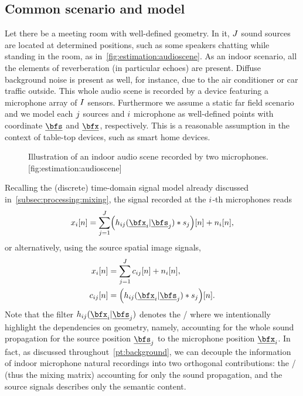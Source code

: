 \subsection{Common scenario and model}
Let there be a meeting room with well-defined geometry.
In it, $J$ sound sources are located at determined positions, such as some speakers chatting while standing in the room, as in~\cref{fig:estimation:audioscene}.
As an indoor scenario, all the elements of reverberation (in particular echoes) are present.
Diffuse background noise is present as well, for instance, due to the air conditioner or car traffic outside.
This whole audio scene is recorded by a device featuring a microphone array of $I$ sensors.
Furthermore we assume a static far field scenario and we model each $j$ sources and $i$ microphone as well-defined points with coordinate $\positionSource$ and $\positionMicrophone$, respectively.
This is a reasonable assumption in the context of table-top devices, such as smart home devices.
\begin{figure}[]
    \begin{sidecaption}{%
        Illustration of an indoor audio scene recorded by two microphones.
    }[fig:estimation:audioscene]
    \centering
    \resizebox{\linewidth}{!}{}
    \end{sidecaption}
\end{figure}
Recalling the (discrete) time-domain signal model already discussed in~\cref{subsec:processing:mixing}, the signal recorded at the $i$-th microphones reads
\begin{equation}
    \label{eq:application:mix}
    \mic_\idxMic[n] = \sum_{\idxSrc = 1}^{\numSrcs}
        \kparen{\flt_{\idxMicSrc}( \positionMicrophone_{\idxMic}  | \positionSource_{\idxSrc}) \convDis \src_{\idxSrc}} [n] + \nse_\idxMic[n]
    ,
\end{equation}
or alternatively, using the source spatial image signals,
\begin{equation}
    \label{eq:application:mix_img}
    \begin{aligned}
        \mic_\idxMic[n]     &= \sum_{\idxSrc = 1}^{\numSrcs} \img_{\idxMicSrc}[n] + \nse_\idxMic[n],\\
        \img_{\idxMicSrc}[n]  &= \kparen{\flt_{\idxMicSrc}( \positionMicrophone_{\idxMic}  | \positionSource_{\idxSrc}) \convDis \src_{\idxSrc}}[n]
        .
    \end{aligned}
\end{equation}
Note that the filter $\flt_{\idxMicSrc}(\positionMicrophone_{\idxMic} | \positionSource_{\idxSrc})$ denotes the \RIR/ where we intentionally highlight the dependencies on geometry,
namely, accounting for the whole sound propagation for the source position $\positionSource_{\idxSrc}$ to the microphone position $\positionMicrophone_{\idxMic}$.
In fact, as discussed throughout~\cref{pt:background}, we can decouple the information of indoor microphone natural recordings into two orthogonal contributions:
the \RIRs/ (thus the mixing matrix) accounting for only the sound propagation, and the source signals describes only the semantic content.

